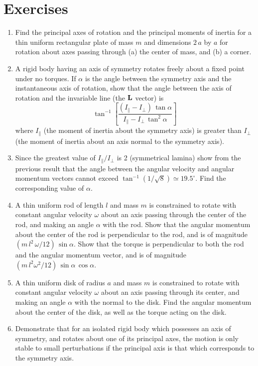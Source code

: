 \section{Exercises}
{\small
\renewcommand{\theenumi}{8.\arabic{enumi}}
\begin{enumerate}
\item Find the principal axes of rotation and the principal moments of inertia for a
thin uniform rectangular plate of mass $m$ and dimensions $2\,a$ by $a$ for rotation
about  axes passing through (a) the center of mass, and (b) a corner.
\item A rigid body having an axis of symmetry rotates freely about a fixed point under no
torques. If $\alpha$ is the angle between the symmetry axis and the instantaneous axis of
rotation, show that the angle between the axis of rotation and the invariable line
(the ${\bf L}$ vector) is
$$
\tan^{-1}\left[\frac{(I_\parallel-I_\perp)\,\tan\alpha}{I_\parallel-I_\perp\,\tan^2\alpha}\right]
$$
where $I_\parallel$ (the moment of inertia about the symmetry axis) is greater than $I_\perp$
(the moment of inertia about an axis normal to the symmetry axis).
\item Since the greatest value of $I_\parallel/I_\perp$ is 2 (symmetrical lamina) show
from the previous result that the angle between the angular velocity and angular momentum
vectors cannot exceed $\tan^{-1}(1/\sqrt{8})\simeq19.5^\circ$. Find the corresponding
value of $\alpha$. 
\item A thin uniform rod of length $l$ and mass $m$ is constrained to rotate
with constant angular velocity $\omega$ about an axis passing through the
center of the rod, and making an angle $\alpha$ with the rod.
Show that the angular momentum about the center of the rod is perpendicular to the rod, and is of magnitude $(m\,l^2\,\omega/12)\,\sin\alpha$. Show that
the torque is perpendicular to both the rod and the angular momentum vector,
and is of magnitude $(m\,l^2\omega^2/12)\,\sin\alpha\,\cos\alpha$. 

\item A thin uniform disk of radius $a$ and mass $m$ is constrained to rotate
with constant angular velocity $\omega$ about an axis passing through its center, and making an angle $\alpha$ with the normal to the disk.
Find the angular momentum about the center of the disk, as
well as the torque acting on the disk. 
\item Demonstrate that for an isolated rigid body which possesses an
axis of symmetry, and rotates about one of its principal axes, the motion is
only stable to small perturbations if the principal axis is that which corresponds to the
symmetry axis. 

\end{enumerate}

}